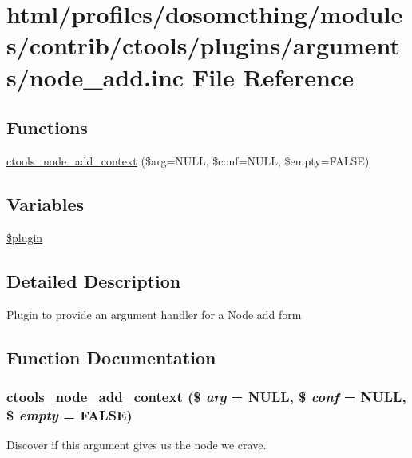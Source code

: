 \hypertarget{node__add_8inc}{
\section{html/profiles/dosomething/modules/contrib/ctools/plugins/arguments/node\_\-add.inc File Reference}
\label{node__add_8inc}
}
\subsection*{Functions}
\begin{DoxyCompactItemize}
\item 
\hyperlink{node__add_8inc_aa9987b51e06c79529fa64e63f41eb9de}{ctools\_\-node\_\-add\_\-context} (\$arg=NULL, \$conf=NULL, \$empty=FALSE)
\end{DoxyCompactItemize}
\subsection*{Variables}
\begin{DoxyCompactItemize}
\item 
\hyperlink{node__add_8inc_ada8a7130088351710bb02ed622d6bf65}{\$plugin}
\end{DoxyCompactItemize}


\subsection{Detailed Description}
Plugin to provide an argument handler for a Node add form 

\subsection{Function Documentation}
\hypertarget{node__add_8inc_aa9987b51e06c79529fa64e63f41eb9de}{
\subsubsection[{ctools\_\-node\_\-add\_\-context}]{\setlength{\rightskip}{0pt plus 5cm}ctools\_\-node\_\-add\_\-context (\$ {\em arg} = {\ttfamily NULL}, \/  \$ {\em conf} = {\ttfamily NULL}, \/  \$ {\em empty} = {\ttfamily FALSE})}}
\label{node__add_8inc_aa9987b51e06c79529fa64e63f41eb9de}
Discover if this argument gives us the node we crave. 


